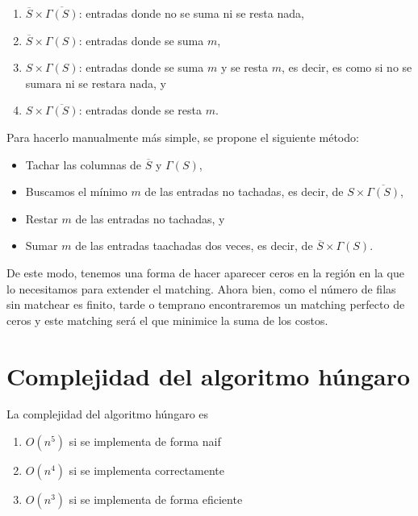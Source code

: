 \documentclass[10pt,a4paper]{article}
\begin{document}
\begin{enumerate}

	\item $\overline{S}\times \overline{\Gamma(S)}$: entradas donde no se suma ni se resta nada,
	\item $\overline{S} \times \Gamma(S)$: entradas donde se suma $m$,
	\item $S \times \Gamma(S)$: entradas donde se suma $m$ y se resta $m$, es decir, es como si no se sumara ni se restara nada, y
	\item $S \times \overline{\Gamma(S)}$: entradas donde se resta $m$.
\end{enumerate}

Para hacerlo manualmente más simple, se propone el siguiente método:

\begin{itemize}

	\item Tachar las columnas de $\overline{S}$ y $\Gamma(S)$,
	\item Buscamos el mínimo $m$ de las entradas no tachadas, es decir, de $S\times \overline{\Gamma(S)}$,
	\item Restar $m$ de las entradas no tachadas, y
	\item Sumar $m$ de las entradas taachadas dos veces, es decir, de $\overline{S} \times \Gamma(S)$.
\end{itemize}

De este modo, tenemos una forma de hacer aparecer ceros en la región en la que lo necesitamos para extender el matching. Ahora bien, como el número de filas sin matchear es finito, tarde o temprano encontraremos un matching perfecto de ceros y este matching será el que minimice la suma de los costos.

\section*{Complejidad del algoritmo húngaro}

La complejidad del algoritmo húngaro es

\begin{enumerate}

	\item $O(n^5)$ si se implementa de forma naif
	\item $O(n^4)$ si se implementa correctamente
	\item $O(n^3)$ si se implementa de forma eficiente
\end{enumerate}
\end{document}
